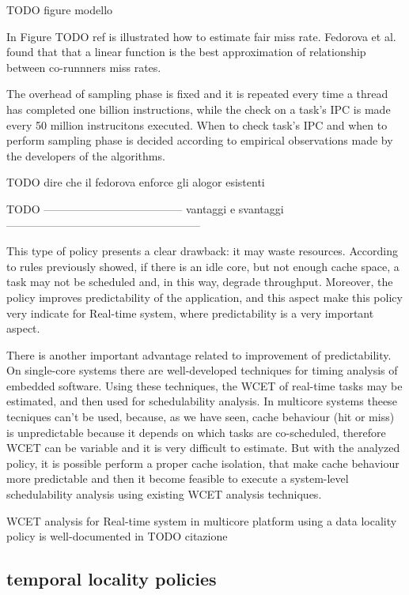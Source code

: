 TODO figure modello

In Figure TODO ref is illustrated how to estimate fair miss rate. Fedorova et al. found that that a linear function is the best approximation of 
relationship between co-runnners miss rates.

The overhead of sampling phase is fixed and it is repeated every time a thread has completed one billion instructions, while the check on a task's IPC
is made every 50 million instrucitons executed. When to check task's IPC and when to perform sampling phase is decided according to empirical observations
made by the developers of the algorithms.

TODO dire che il fedorova enforce gli alogor esistenti

TODO -------------------------------------- vantaggi e svantaggi -----------------------------------------------------

This type of policy presents a clear drawback: it may waste resources. According to rules previously showed, if there is an idle core, but not enough cache 
space, a task may not be scheduled and, in this way, degrade throughput. Moreover, the policy improves predictability of the application, and this aspect
make this policy very indicate for Real-time system, where predictability is a very important aspect.

There is another important advantage related to improvement of predictability. On single-core systems there are well-developed techniques for timing 
analysis of embedded software. Using these techniques, the WCET of real-time tasks may be estimated, and then used for 
schedulability analysis. In multicore systems theese tecniques can't be used, because, as we have seen, cache behaviour (hit or miss) is unpredictable
because it depends on which tasks are co-scheduled, therefore WCET can be variable and it is very difficult to estimate.
But with the analyzed policy, it is possible perform a proper cache isolation, that make cache behaviour more predictable and then it become feasible to 
execute a system-level schedulability analysis using existing WCET analysis techniques.

WCET analysis for Real-time system in multicore platform using a data locality policy is well-documented in TODO citazione

\subsection{temporal locality policies} 


